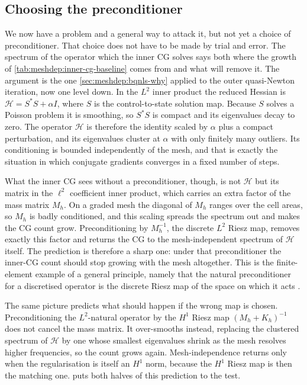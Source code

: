 \documentclass[a4paper,11pt]{article}
\theoremstyle{spacedplain} \newtheorem{theorem}[counter]{Theorem} \newtheorem{lemma}[counter]{Lemma} \newtheorem{prop}[counter]{Proposition} \newtheorem{cor}[counter]{Corollary}
\theoremstyle{spaceddefinition} \newtheorem{defn}[counter]{Definition} \newtheorem{example}[counter]{Example} \newtheorem{remark}[counter]{Remark}
\begin{document}
\subsection{Choosing the preconditioner}
\label{sec:precond:spectral}

We now have a problem and a general way to attack it, but not yet a choice of preconditioner. That choice does not have to be made by trial and error. The spectrum of the operator which the inner CG solves says both where the growth of \cref{tab:meshdep:inner-cg-baseline} comes from and what will remove it. The argument is the one \cref{sec:meshdep:bqnls-why} applied to the outer quasi-Newton iteration, now one level down. In the $L^{2}$ inner product the reduced Hessian is $\mathcal{H} = S^{*}S + \alpha I$, where $S$ is the control-to-state solution map. Because $S$ solves a Poisson problem it is smoothing, so $S^{*}S$ is compact and its eigenvalues decay to zero. The operator $\mathcal{H}$ is therefore the identity scaled by $\alpha$ plus a compact perturbation, and its eigenvalues cluster at $\alpha$ with only finitely many outliers. Its conditioning is bounded independently of the mesh, and that is exactly the situation in which conjugate gradients converges in a fixed number of steps.

What the inner CG sees without a preconditioner, though, is not $\mathcal{H}$ but its matrix in the $\ell^{2}$ coefficient inner product, which carries an extra factor of the mass matrix $M_h$. On a graded mesh the diagonal of $M_h$ ranges over the cell areas, so $M_h$ is badly conditioned, and this scaling spreads the spectrum out and makes the CG count grow. Preconditioning by $M_h^{-1}$, the discrete $L^{2}$ Riesz map, removes exactly this factor and returns the CG to the mesh-independent spectrum of $\mathcal{H}$ itself. The prediction is therefore a sharp one: under that preconditioner the inner-CG count should stop growing with the mesh altogether. This is the finite-element example of a general principle, namely that the natural preconditioner for a discretised operator is the discrete Riesz map of the space on which it acts \citep{kirby2010, mardal2011}.

The same picture predicts what should happen if the wrong map is chosen. Preconditioning the $L^{2}$-natural operator by the $H^{1}$ Riesz map $(M_h + K_h)^{-1}$ does not cancel the mass matrix. It over-smooths instead, replacing the clustered spectrum of $\mathcal{H}$ by one whose smallest eigenvalues shrink as the mesh resolves higher frequencies, so the count grows again. Mesh-independence returns only when the regularisation is itself an $H^{1}$ norm, because the $H^{1}$ Riesz map is then the matching one.  puts both halves of this prediction to the test.
\end{document}

